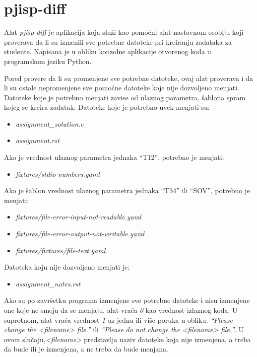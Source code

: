 \documentclass[12pt]{report}
\begin{document}
\section{pjisp-diff}

Alat \textit{pjisp-diff} \cite{pjisp-diff} je aplikacija koja služi kao pomoćni alat nastavnom osoblju koji proverava da li su izmenili sve potrebne datoteke pri kreiranju zadataka za studente. Napisana je u obliku konzolne aplikacije otvorenog koda u programskom jeziku Python.

Pored provere da li su promenjene sve potrebne datoteke, ovaj alat proverava i da li su ostale nepromenjene sve pomoćne datoteke koje nije dozvoljeno menjati. Datoteke koje je potrebno menjati zavise od ulaznog parametra, šablona spram kojeg se kreira zadatak. Datoteke koje je potrebno uvek menjati su:

\begin{itemize}
    \item \textit{assignment\_solution.c}
    \item \textit{assignment.rst}
\end{itemize}

Ako je vrednost ulaznog parametra jednaka ``T12'', potrebno je menjati:

\begin{itemize}
    \item \textit{fixtures/stdio-numbers.yaml}
\end{itemize}

Ako je šablon vrednost ulaznog parametra jednaka ``T34'' ili ``SOV'', potrebno je menjati:

\begin{itemize}
    \item \textit{fixtures/file-error-input-not-readable.yaml}
    \item \textit{fixtures/file-error-output-not-writable.yaml}
    \item \textit{fixtures/fixtures/file-text.yaml}
\end{itemize}

Datoteka koju nije dozvoljeno menjati je:

\begin{itemize}
    \item \textit{assignment\_notes.rst}
\end{itemize}

Ako su po završetku programa izmenjene sve potrebne datoteke i nisu izmenjene one koje ne smeju da se menjaju, alat vraća \textit{0} kao vrednost izlaznog koda. U suprotnom, alat vraća vrednost \textit{1} uz jednu ili više poruka u obliku: \textit{``Please change the <filename> file.''} ili \textit{``Please do not change the <filename> file.''}. U ovom slučaju,\textit{<filename>} predstavlja naziv datoteke koja nije izmenjena, a treba da bude ili je izmenjena, a ne treba da bude menjana.
\end{document}
